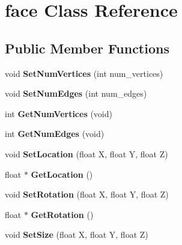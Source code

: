 \hypertarget{classface}{}\section{face Class Reference}
\label{classface}
\subsection*{Public Member Functions}
\begin{DoxyCompactItemize}
\item 
\mbox{\label{classface_a308875a2b47d0b3b53e406e1b9310a1c}} 
void {\bfseries Set\+Num\+Vertices} (int num\+\_\+vertices)
\item 
\mbox{\label{classface_a345c597eb374c07b8fad51c51b5c9aba}} 
void {\bfseries Set\+Num\+Edges} (int num\+\_\+edges)
\item 
\mbox{\label{classface_a263f47c5a0714d2f9fb7067d24603b07}} 
int {\bfseries Get\+Num\+Vertices} (void)
\item 
\mbox{\label{classface_a04921ee060440a416098fd62ad8ed55d}} 
int {\bfseries Get\+Num\+Edges} (void)
\item 
\mbox{\label{classface_aed1a53fd90c464622d9ec00b70143c49}} 
void {\bfseries Set\+Location} (float X, float Y, float Z)
\item 
\mbox{\label{classface_a699a579160b5f165bdd4d99c102d8103}} 
float $\ast$ {\bfseries Get\+Location} ()
\item 
\mbox{\label{classface_a71969f0627480de1764fcbb13de379c3}} 
void {\bfseries Set\+Rotation} (float X, float Y, float Z)
\item 
\mbox{\label{classface_a9f3e71973ddda30f0cdddbc288d4e748}} 
float $\ast$ {\bfseries Get\+Rotation} ()
\item 
\mbox{\label{classface_a282640bd3aabb05eb7c4a1fa1311db52}} 
void {\bfseries Set\+Size} (float X, float Y, float Z)
\item 
\mbox{\label{classface_aa3971953d8cb1688e5d4cce2a466bb58}} 

\end{DoxyCompactItemize}
